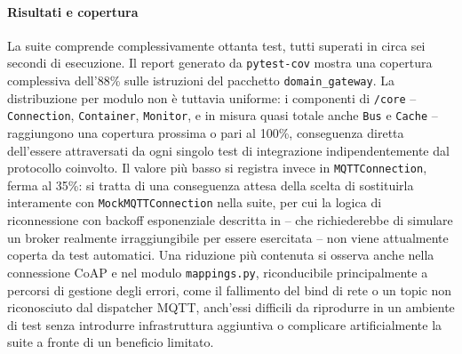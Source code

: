 \paragraph{Risultati e copertura}
La suite comprende complessivamente ottanta test, tutti superati in circa sei secondi di esecuzione. Il report generato da \texttt{pytest-cov} mostra una copertura complessiva dell'88\% sulle istruzioni del pacchetto \texttt{domain\_gateway}. La distribuzione per modulo non è tuttavia uniforme: i componenti di \texttt{/core} -- \texttt{Connection}, \texttt{Container}, \texttt{Monitor}, e in misura quasi totale anche \texttt{Bus} e \texttt{Cache} -- raggiungono una copertura prossima o pari al 100\%, conseguenza diretta dell'essere attraversati da ogni singolo test di integrazione indipendentemente dal protocollo coinvolto. Il valore più basso si registra invece in \texttt{MQTTConnection}, ferma al 35\%: si tratta di una conseguenza attesa della scelta di sostituirla interamente con \texttt{MockMQTTConnection} nella suite, per cui la logica di riconnessione con backoff esponenziale descritta in  -- che richiederebbe di simulare un broker realmente irraggiungibile per essere esercitata -- non viene attualmente coperta da test automatici. Una riduzione più contenuta si osserva anche nella connessione \ac{CoAP} e nel modulo \texttt{mappings.py}, riconducibile principalmente a percorsi di gestione degli errori, come il fallimento del bind di rete o un topic non riconosciuto dal dispatcher \ac{MQTT}, anch'essi difficili da riprodurre in un ambiente di test senza introdurre infrastruttura aggiuntiva o complicare artificialmente la suite a fronte di un beneficio limitato.
%